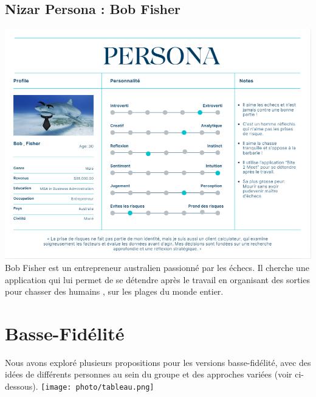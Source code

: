 \documentclass{article}
\begin{document}
\subsection*{Nizar Persona : Bob Fisher}
\includegraphics[width=1\textwidth]{photo/Persona_Nizar.png}\\

Bob Fisher est un entrepreneur australien passionné par les échecs. Il cherche une application qui lui permet de se détendre après le travail en organisant des sorties pour chasser
des humains , sur les plages du monde entier.\\

\section{Basse-Fidélité}
Nous avons exploré plusieurs propositions pour les versions basse-fidélité, avec des idées de différents personnes au sein du groupe et des approches variées (voir ci-dessous). 
\texttt{[image: photo/tableau.png]}
\newpage
\end{document}
